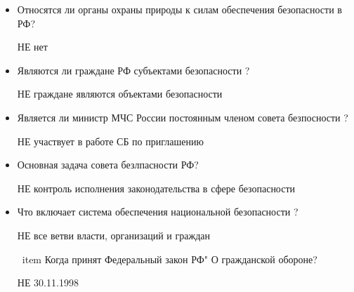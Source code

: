 \documentclass[oneside,final,14pt]{extreport}
\begin{document}
\begin{itemize}
	\item Относятся ли органы охраны природы к силам обеспечения безопасности в РФ?
	
	НЕ нет
	
	\item Являются ли граждане РФ субъектами безопасности ?
	
	НЕ  граждане являются объектами безопасности
	
	 \item Является ли министр МЧС России  постоянным членом совета безпосности ?
	 
	 НЕ участвует в работе СБ  по приглашению
	 
	  \item Основная задача совета безлпасности РФ?
	  
	  НЕ контроль исполнения законодательства в сфере безопасности
	  
	 \item Что включает система обеспечения национальной безопасности ?
	 
	 НЕ все ветви власти, организаций и граждан 
	 
	 \ item Когда принят Федеральный закон РФ" О гражданской обороне?
	 
	 НЕ 30.11.1998 
	
	
\end{itemize}
\end{document}

